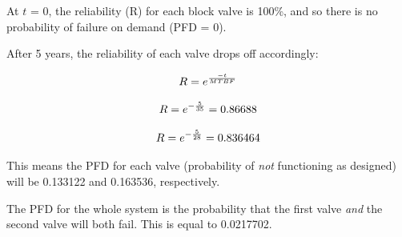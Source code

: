 
At $t$ = 0, the reliability (R) for each block valve is 100\%, and so there is no probability of failure on demand (PFD = 0).

\vskip 10pt

After 5 years, the reliability of each valve drops off accordingly:

$$R = e ^{- t \over MTBF}$$

$$R = e ^{- {5 \over 35}} = 0.86688$$

$$R = e ^{- {5 \over 28}} = 0.836464$$

This means the PFD for each valve (probability of {\it not} functioning as designed) will be 0.133122 and 0.163536, respectively.

\vskip 10pt

The PFD for the whole system is the probability that the first valve {\it and} the second valve will both fail.  This is equal to 0.0217702.




